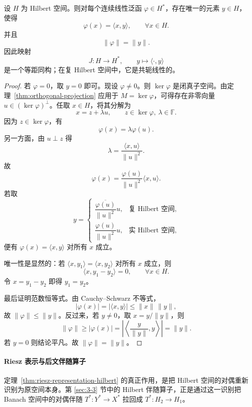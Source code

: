\begin{theorem}\label{thm:riesz-representation-hilbert}
设 $H$ 为 Hilbert 空间。则对每个连续线性泛函 $\varphi\in H^\ast$，存在唯一的元素 $y\in H$，使得
\[
\varphi(x)=\langle x,y\rangle,\qquad \forall x\in H.
\]
并且
\[
\|\varphi\|=\|y\|.
\]
因此映射
\[
J\colon H\to H^\ast,\qquad y\mapsto \langle\cdot,y\rangle
\]
是一个等距同构；在复 Hilbert 空间中，它是共轭线性的。
\end{theorem}

\begin{proof}
若 $\varphi=0$，取 $y=0$ 即可。现设 $\varphi\neq 0$。则 $\ker\varphi$ 是闭真子空间。由定理~\ref{thm:orthogonal-projection} 应用于 $M=\ker\varphi$，可得存在非零向量 $u\in (\ker\varphi)^\perp$。任取 $x\in H$，将其分解为
\[
x=z+\lambda u,\qquad z\in \ker\varphi,\ \lambda\in \mathbb F.
\]
因为 $z\in \ker\varphi$，有
\[
\varphi(x)=\lambda \varphi(u).
\]
另一方面，由 $u\perp z$ 得
\[
\lambda=\frac{\langle x,u\rangle}{\|u\|^2}.
\]
故
\[
\varphi(x)=\frac{\varphi(u)}{\|u\|^2}\langle x,u\rangle.
\]
若取
\[
y=
\begin{cases}
\dfrac{\overline{\varphi(u)}}{\|u\|^2}u, & \text{复 Hilbert 空间},\\[1ex]
\dfrac{\varphi(u)}{\|u\|^2}u, & \text{实 Hilbert 空间},
\end{cases}
\]
便有 $\varphi(x)=\langle x,y\rangle$ 对所有 $x$ 成立。

唯一性是显然的：若 $\langle x,y_1\rangle=\langle x,y_2\rangle$ 对所有 $x$ 成立，则
\[
\langle x,y_1-y_2\rangle=0,\qquad \forall x\in H.
\]
令 $x=y_1-y_2$ 即得 $y_1=y_2$。

最后证明范数恒等式。由 Cauchy--Schwarz 不等式，
\[
|\varphi(x)|=|\langle x,y\rangle|\le \|x\|\,\|y\|,
\]
故 $\|\varphi\|\le \|y\|$。反过来，若 $y\neq 0$，取 $x=y/\|y\|$，则
\[
\|\varphi\|\ge |\varphi(x)|=\left|\left\langle \frac{y}{\|y\|},y\right\rangle\right|=\|y\|.
\]
若 $y=0$ 则结论平凡。故 $\|\varphi\|=\|y\|$。
\end{proof}

\paragraph{Riesz 表示与后文伴随算子}

\begin{remark}
定理~\ref{thm:riesz-representation-hilbert} 的真正作用，是把 Hilbert 空间的对偶重新识别为原空间本身。第 \ref{sec:3-3} 节中的 Hilbert 伴随算子，正是通过这一识别把 Banach 空间中的对偶伴随 $T^\ast\colon Y^\ast\to X^\ast$ 拉回成 $T^\ast\colon H_2\to H_1$。
\end{remark}

